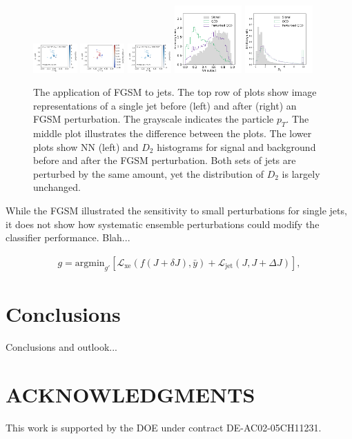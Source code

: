\documentclass[reprint,nofootinbib,...]{revtex4-1}
\begin{document}
\begin{figure}[h!]
\centering
\includegraphics[width=0.15\textwidth]{figures/panel_1.pdf}
\includegraphics[width=0.15\textwidth]{figures/panel_3.pdf}
\includegraphics[width=0.15\textwidth]{figures/panel_2.pdf}
\includegraphics[width=0.23\textwidth]{figures/NN_FGSM.pdf}
\includegraphics[width=0.23\textwidth]{figures/D2_FGSM.pdf}
\caption{The application of FGSM to jets.  The top row of plots show image representations of a single jet before (left) and after (right) an FGSM perturbation.  The grayscale indicates the particle $p_T$.  The middle plot illustrates the difference between the plots.  The lower plots show NN (left) and $D_2$ histograms for signal and background before and after the FGSM perturbation.  Both sets of jets are perturbed by the same amount, yet the distribution of $D_2$ is largely unchanged. }
\label{fig:FGSM}
\end{figure}

While the FGSM illustrated the sensitivity to small perturbations for single jets, it does not show how systematic ensemble perturbations could modify the classifier performance.  Blah...

\begin{align}
\label{eq:global}
g=\text{argmin}_{g'}\left[\mathcal{L}_\text{xe}(f(J+\delta J),\bar{y})+\mathcal{L}_\text{jet}(J,J+\Delta J)\right],
\end{align}


\section{Conclusions}
Conclusions and outlook...

\section*{ACKNOWLEDGMENTS}

This work is supported by the DOE under contract DE-AC02-05CH11231. 


\end{document}
